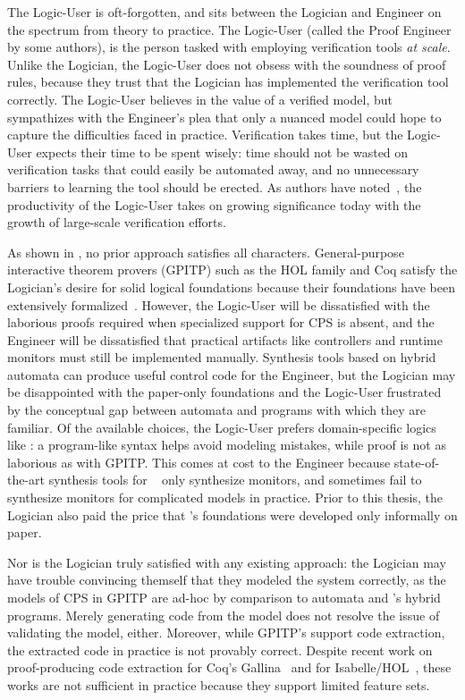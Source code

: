 \documentclass[12pt]{cmuthesis}
\theoremstyle{definition}
\theoremstyle{remark}
\newcommand{\rref}[2][]{\prettyref{#2}}
\newcommand{\Isabelle}{Isabelle/HOL\xspace}
\newcommand{\Coq}{Coq\xspace}
\begin{document}
The Logic-User is oft-forgotten, and sits between the Logician and Engineer on the spectrum from theory to practice.
The Logic-User (called the Proof Engineer by some authors), is the person tasked with employing verification tools \emph{at scale}.
Unlike the Logician, the Logic-User does not obsess with the soundness of proof rules, because they trust that the Logician has implemented the verification tool correctly.
The Logic-User believes in the value of a verified model, but sympathizes with the Engineer's plea that only a nuanced model could hope to capture the difficulties faced in practice.
Verification takes time, but the Logic-User expects their time to be spent wisely: time should not be wasted on verification tasks that could easily be automated away, and no unnecessary barriers to learning the tool should be erected.
As authors have noted~\cite{ringer2019qed}, the productivity of the Logic-User takes on growing significance today with the growth of large-scale verification efforts.

As shown in \rref{tab:approach-comparison}, no prior approach satisfies all characters.
General-purpose interactive theorem provers (GPITP) such as the HOL family and \Coq satisfy the Logician's desire for solid logical foundations because their foundations have been extensively formalized~\cite{DBLP:journals/jfrea/Barras10,DBLP:journals/jar/KumarAMO16}.
However, the Logic-User will be dissatisfied with the laborious proofs required when specialized support for CPS is absent,
and the Engineer will be dissatisfied that practical artifacts like controllers and runtime monitors must still be implemented manually.
Synthesis tools based on hybrid automata can produce useful control code for the Engineer, but the Logician may be disappointed with the paper-only foundations and the Logic-User frustrated by the conceptual gap between automata and programs with which they are familiar.
Of the available choices, the Logic-User prefers domain-specific logics like \dL: a program-like syntax helps avoid modeling mistakes, while proof is not as laborious as with GPITP.
This comes at cost to the Engineer because state-of-the-art synthesis tools for \dL~\cite{DBLP:journals/fmsd/MitschP16} only synthesize monitors, and sometimes fail to synthesize monitors for complicated models in practice.
Prior to this thesis, the Logician also paid the price that \dL's foundations were developed only informally on paper.

Nor is the Logician truly satisfied with any existing approach: the Logician may have trouble convincing themself that they modeled the system correctly, as the models of CPS in GPITP are ad-hoc by comparison to automata and \dL's hybrid programs. Merely generating code from the model does not resolve the issue of validating the model, either.
Moreover, while GPITP's  support code extraction,  the extracted code in practice is not provably correct. Despite recent work on proof-producing code extraction for Coq's Gallina~\cite{DBLP:conf/cpp/MullenPWTG18,anand2017certicoq,DBLP:conf/nfm/IoannidisKZ19} and for \Isabelle~\cite{DBLP:conf/esop/HupelN18}, these works are not sufficient in practice because they support limited feature sets.
\end{document}
